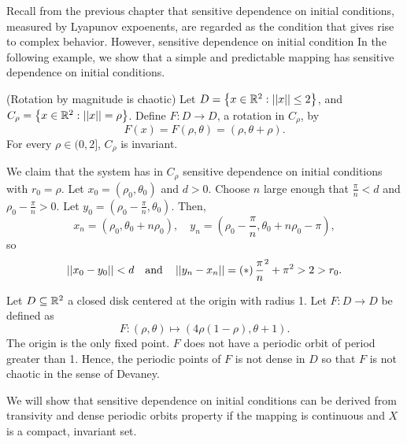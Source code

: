 \documentclass[12pt,draft,twoside]{book}
\begin{document}
Recall from the previous chapter that sensitive dependence on initial conditions, measured by Lyapunov expoenents, are regarded as the condition that gives rise to complex behavior.
However, sensitive dependence on initial condition 
In the following example, we show that a simple and predictable mapping has sensitive dependence on initial conditions.
%
\begin{example}
  (Rotation by magnitude is chaotic)
  Let $D = \left \{ x \in \mathbb{R}^2: \left|\left| x \right|\right| \leq 2 \right \}$, and $C_\rho = \left \{ x \in \mathbb{R}^2: \left|\left| x \right|\right| = \rho \right \}$.
  Define $F: D \to D$, a rotation in $C_\rho$, by
  \begin{equation*}
    F(x) = F(\rho, \theta) = (\rho, \theta + \rho).
  \end{equation*}
  For every $\rho \in (0,2]$, $C_\rho$ is invariant.

  We claim that the system has in $C_\rho$ sensitive dependence on initial conditions with $r_0 = \rho$.
  Let $x_0 = (\rho_0, \theta_0)$ and $d > 0$.
  Choose $n$ large enough that $\frac{\pi}{n} < d$ and $\rho_0 - \frac{\pi}{n} > 0$.
  Let $y_0 = (\rho_0 - \frac{\pi}{n}, \theta_0)$.
  Then,
  \begin{equation*}
    x_n = (\rho_0, \theta_0 + n\rho_0),\quad
    y_n = (\rho_0 - \frac{\pi}{n}, \theta_0 + n\rho_0 - \pi),
  \end{equation*}
  so
  \begin{equation*}
    \left|\left| x_0 - y_0 \right|\right| < d \quad \mbox{and} \quad \left|\left| y_n - x_n \right|\right| = \left ( * \right ){\frac{\pi}{n}}^2 + \pi^2 > 2 > r_0.
  \end{equation*}
\end{example}

\begin{example}
  Let $D \subseteq \mathbb{R}^2$ a closed disk centered at the origin with radius 1.
  Let $F: D \to D$ be defined as
  \begin{equation*}
    F: (\rho, \theta) \mapsto (4\rho(1 - \rho), \theta + 1).
  \end{equation*}
  The origin is the only fixed point.
  $F$ does not have a periodic orbit of period greater than 1.
  Hence, the periodic points of $F$ is not dense in $D$ so that $F$ is not chaotic in the sense of Devaney.
\end{example}

We will show that sensitive dependence on initial conditions can be derived from transivity and dense periodic orbits property if the mapping is continuous and $X$ is a compact, invariant set. \citep{banks}
\end{document}

